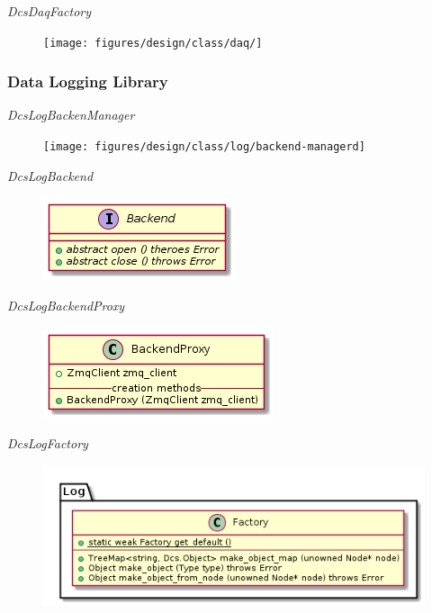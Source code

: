       \emph{DcsDaqFactory}

        \begin{figure}[H]
          \texttt{[image: figures/design/class/daq/]}
        \end{figure}

    \subsubsection{Data Logging Library}\label{sec:dsg-classes-log}

      \emph{DcsLogBackenManager}

        \begin{figure}[H]
          \texttt{[image: figures/design/class/log/backend-managerd]}
        \end{figure}

      \emph{DcsLogBackend}

        \begin{figure}[H]
          \includegraphics{figures/design/class/log/backend}
        \end{figure}

      \emph{DcsLogBackendProxy}

        \begin{figure}[H]
          \includegraphics{figures/design/class/log/backend-proxy}
        \end{figure}

      \emph{DcsLogFactory}

        \begin{figure}[H]
          \includegraphics{figures/design/class/log/factory}
        \end{figure}

